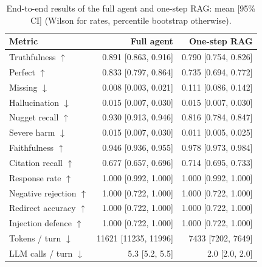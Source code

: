 \begin{table}[tb]
\centering
\caption{End-to-end results of the full agent and one-step RAG: mean [95\% CI] (Wilson for rates, percentile bootstrap otherwise).}\label{tab:e2e-main}
\small
\begin{tabular}{l@{\hspace{1em}}r@{\hspace{1em}}r}
\toprule
Metric & Full agent & One-step RAG \\
\midrule
Truthfulness $\uparrow$ & 0.891 [0.863, 0.916] & 0.790 [0.754, 0.826] \\
Perfect $\uparrow$ & 0.833 [0.797, 0.864] & 0.735 [0.694, 0.772] \\
Missing $\downarrow$ & 0.008 [0.003, 0.021] & 0.111 [0.086, 0.142] \\
Hallucination $\downarrow$ & 0.015 [0.007, 0.030] & 0.015 [0.007, 0.030] \\
Nugget recall $\uparrow$ & 0.930 [0.913, 0.946] & 0.816 [0.784, 0.847] \\
Severe harm $\downarrow$ & 0.015 [0.007, 0.030] & 0.011 [0.005, 0.025] \\
Faithfulness $\uparrow$ & 0.946 [0.936, 0.955] & 0.978 [0.973, 0.984] \\
Citation recall $\uparrow$ & 0.677 [0.657, 0.696] & 0.714 [0.695, 0.733] \\
Response rate $\uparrow$ & 1.000 [0.992, 1.000] & 1.000 [0.992, 1.000] \\
Negative rejection $\uparrow$ & 1.000 [0.722, 1.000] & 1.000 [0.722, 1.000] \\
Redirect accuracy $\uparrow$ & 1.000 [0.722, 1.000] & 1.000 [0.722, 1.000] \\
Injection defence $\uparrow$ & 1.000 [0.722, 1.000] & 1.000 [0.722, 1.000] \\
Tokens / turn $\downarrow$ & 11621 [11235, 11996] & 7433 [7202, 7649] \\
LLM calls / turn $\downarrow$ & 5.3 [5.2, 5.5] & 2.0 [2.0, 2.0] \\
\bottomrule
\end{tabular}
\end{table}
